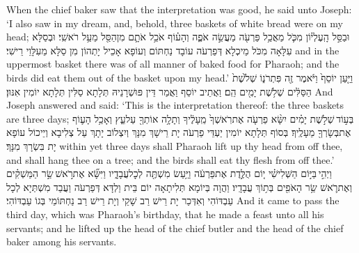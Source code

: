 {When the chief baker saw that the interpretation was good, he said unto Joseph: ‘I also saw in my dream, and, behold, three baskets of white bread were on my head;}{}
{וּבַסַּ֣ל הָֽעֶלְי֗וֹן מִכֹּ֛ל מַאֲכַ֥ל פַּרְעֹ֖ה מַעֲשֵׂ֣ה אֹפֶ֑ה וְהָע֗וֹף אֹכֵ֥ל אֹתָ֛ם מִן\maqqaf הַסַּ֖ל מֵעַ֥ל רֹאשִֽׁי׃}
{וּבְסַלָּא עִלָּאָה מִכֹּל מֵיכְלָא דְּפַרְעֹה עוֹבָד נַחְתּוֹם וְעוֹפָא אָכֵיל יָתְהוֹן מִן סַלָּא מֵעִלָּוֵי רֵישִׁי׃}
{and in the uppermost basket there was of all manner of baked food for Pharaoh; and the birds did eat them out of the basket upon my head.’}{}
{וַיַּ֤עַן יוֹסֵף֙ וַיֹּ֔אמֶר זֶ֖ה פִּתְרֹנ֑וֹ שְׁלֹ֙שֶׁת֙ הַסַּלִּ֔ים שְׁלֹ֥שֶׁת יָמִ֖ים הֵֽם׃}
{וַאֲתֵיב יוֹסֵף וַאֲמַר דֵּין פּוּשְׁרָנֵיהּ תְּלָתָא סַלִּין תְּלָתָא יוֹמִין אִנּוּן׃}
{And Joseph answered and said: ‘This is the interpretation thereof: the three baskets are three days;}{}
{בְּע֣וֹד \legarmeh  שְׁלֹ֣שֶׁת יָמִ֗ים יִשָּׂ֨א פַרְעֹ֤ה אֶת\maqqaf רֹֽאשְׁךָ֙ מֵֽעָלֶ֔יךָ וְתָלָ֥ה אוֹתְךָ֖ עַל\maqqaf עֵ֑ץ וְאָכַ֥ל הָע֛וֹף אֶת\maqqaf בְּשָׂרְךָ֖ מֵעָלֶֽיךָ׃}
{בְּסוֹף תְּלָתָא יוֹמִין יַעְדֵּי פַרְעֹה יָת רֵישָׁךְ מִנָּךְ וְיִצְלוֹב יָתָךְ עַל צְלִיבָא וְיֵיכוֹל עוֹפָא יָת בִּשְׂרָךְ מִנָּךְ׃}
{within yet three days shall Pharaoh lift up thy head from off thee, and shall hang thee on a tree; and the birds shall eat thy flesh from off thee.’}{}
{וַיְהִ֣י \legarmeh  בַּיּ֣וֹם הַשְּׁלִישִׁ֗י י֚וֹם הֻלֶּ֣דֶת אֶת\maqqaf פַּרְעֹ֔ה וַיַּ֥עַשׂ מִשְׁתֶּ֖ה לְכׇל\maqqaf עֲבָדָ֑יו וַיִּשָּׂ֞א אֶת\maqqaf רֹ֣אשׁ \legarmeh  שַׂ֣ר הַמַּשְׁקִ֗ים וְאֶת\maqqaf רֹ֛אשׁ שַׂ֥ר הָאֹפִ֖ים בְּת֥וֹךְ עֲבָדָֽיו׃}
{וַהֲוָה בְּיוֹמָא תְּלִיתָאָה יוֹם בֵּית וַלְדָּא דְּפַרְעֹה וַעֲבַד מִשְׁתְּיָא לְכָל עַבְדּוֹהִי וְאִדְּכַר יָת רֵישׁ רַב שָׁקֵי וְיָת רֵישׁ רַב נַחְתּוֹמֵי בְּגוֹ עַבְדּוֹהִי׃}
{And it came to pass the third day, which was Pharaoh’s birthday, that he made a feast unto all his servants; and he lifted up the head of the chief butler and the head of the chief baker among his servants.}{}
